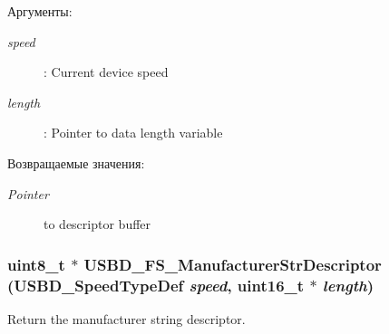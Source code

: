 \begin{Desc}
\item[Аргументы:]
\begin{description}
\item[{\em speed}]: Current device speed \item[{\em length}]: Pointer to data length variable \end{description}
\end{Desc}
\begin{Desc}
\item[Возвращаемые значения:]
\begin{description}
\item[{\em Pointer}]to descriptor buffer \end{description}
\end{Desc}
\hypertarget{group___u_s_b_d___d_e_s_c___private___functions_g6427a671827813efe1a46c3dfcb05683}{
\subsubsection[{USBD\_\-FS\_\-ManufacturerStrDescriptor}]{\setlength{\rightskip}{0pt plus 5cm}uint8\_\-t $\ast$ USBD\_\-FS\_\-ManufacturerStrDescriptor (USBD\_\-SpeedTypeDef {\em speed}, \/  uint16\_\-t $\ast$ {\em length})}}
\label{group___u_s_b_d___d_e_s_c___private___functions_g6427a671827813efe1a46c3dfcb05683}


Return the manufacturer string descriptor. 


